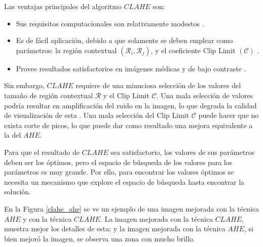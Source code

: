 Las ventajas principales del algoritmo $CLAHE$ son:
\begin{itemize}
    \item Sus requisitos computacionales son relativamente modestos \cite{Zuiderveld1994}.
    \item Es de fácil aplicación, debido a que solamente se deben emplear como parámetros: la región contextual $(\mathcal{R}_i, \mathcal{R}_j)$, y el coeficiente Clip Limit $(\mathscr{C})$ \cite{Zuiderveld1994}.
    \item Provee resultados satisfactorios en imágenes médicas y de bajo contraste \cite{SMG11}.
\end{itemize}

Sin embargo, $CLAHE$ requiere de una minuciosa selección de los valores del tamaño de región contextual $\mathcal{R}$ y el Clip Limit $\mathscr{C}$. Una mala selección de valores podría resultar en amplificación del ruido en la imagen, lo que degrada la calidad de visualización de esta \cite{pisano1998}. Una mala selección del Clip Limit $\mathscr{C}$ puede hacer que no exista corte de picos, lo que puede dar como resultado una mejora equivalente a la del $AHE$.

Para que el resultado de $CLAHE$ sea satisfactorio, los valores de sus parámetros deben ser los óptimos, pero el espacio de búsqueda de los valores para los parámetros es muy grande. Por ello, para encontrar los valores óptimos se necesita un mecanismo que explore el espacio de búsqueda hasta encontrar la solución.

En la Figura \ref{clahe_ahe} se ve un ejemplo de una imagen mejorada con la técnica $AHE$ y con la técnica $CLAHE$. La imagen mejorada con la técnica $CLAHE$, muestra mejor los detalles de esta; y la imagen mejorada con la técnica $AHE$, si bien mejoró la imagen, se observa una zona con mucho brillo.


